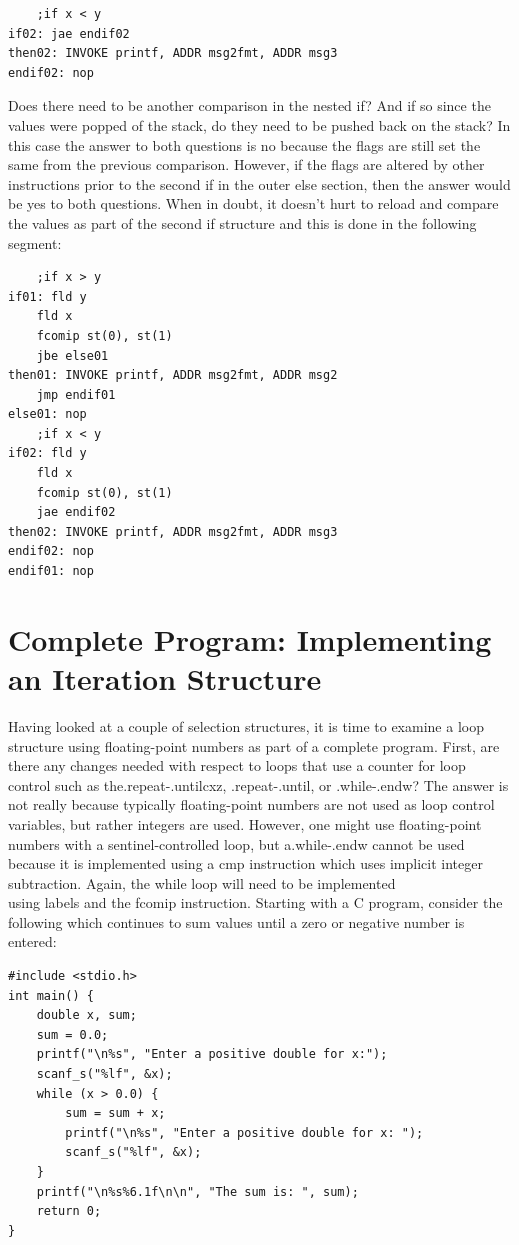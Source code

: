 \documentclass[10pt]{book}
\begin{document}
\begin{verbatim}
    ;if x < y
if02: jae endif02
then02: INVOKE printf, ADDR msg2fmt, ADDR msg3
endif02: nop
\end{verbatim}

Does there need to be another comparison in the nested if? And if so since the values were popped of the stack, do they need to be pushed back on the stack? In this case the answer to both questions is no because the flags are still set the same from the previous comparison. However, if the flags are altered by other instructions prior to the second if in the outer else section, then the answer would be yes to both questions. When in doubt, it doesn't hurt to reload and compare the values as part of the second if structure and this is done in the following segment:

\begin{verbatim}
    ;if x > y
if01: fld y
    fld x
    fcomip st(0), st(1)
    jbe else01
then01: INVOKE printf, ADDR msg2fmt, ADDR msg2
    jmp endif01
else01: nop
    ;if x < y
if02: fld y
    fld x
    fcomip st(0), st(1)
    jae endif02
then02: INVOKE printf, ADDR msg2fmt, ADDR msg3
endif02: nop
endif01: nop
\end{verbatim}

\section{Complete Program: Implementing an Iteration Structure}
Having looked at a couple of selection structures, it is time to examine a loop structure using floating-point numbers as part of a complete program. First, are there any changes needed with respect to loops that use a counter for loop control such as the.repeat-.untilcxz, .repeat-.until, or .while-.endw? The answer is not really because typically floating-point numbers are not used as loop control variables, but rather integers are used. However, one might use floating-point numbers with a sentinel-controlled loop, but a.while-.endw cannot be used because it is implemented using a cmp instruction which uses implicit integer subtraction. Again, the while loop will need to be implemented\\
using labels and the fcomip instruction. Starting with a C program, consider the following which continues to sum values until a zero or negative number is entered:


\begin{verbatim}
#include <stdio.h>
int main() {
    double x, sum;
    sum = 0.0;
    printf("\n%s", "Enter a positive double for x:");
    scanf_s("%lf", &x);
    while (x > 0.0) {
        sum = sum + x;
        printf("\n%s", "Enter a positive double for x: ");
        scanf_s("%lf", &x);
    }
    printf("\n%s%6.1f\n\n", "The sum is: ", sum);
    return 0;
}
\end{verbatim}
\end{document}
